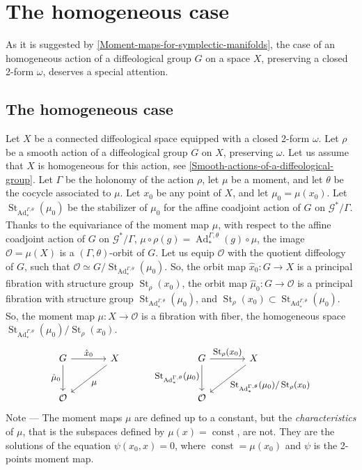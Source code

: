 \documentclass[10pt,reqno,twoside]{amsart}
\newcommand{\cG}{\mathcal{G}}
\newcommand{\cO}{\mathcal{O}}
\DeclareMathOperator{\Stab}{St}
\DeclareMathOperator{\Ad}{Ad}
\DeclareMathOperator{\const}{const}
\theoremstyle{plain}
\theoremstyle{definition}
\newcommand{\article}[1]{\subsection{#1}}
\begin{document}
  \section{The homogeneous case}
  
  As it is suggested by \ref{Moment-maps-for-symplectic-manifolds},
  the case of an homogeneous action of a diffeological group $G$ on a space $X$,
  preserving a closed 2-form $\omega$,
  deserves a special attention.
  
  \article{The homogeneous case}
  \label{The-homogeneous-case}
  Let $X$ be a connected diffeological space equipped with a closed 2-form $\omega$.
  Let $\rho$ be a smooth action of a diffeological group $G$ on $X$,
  preserving $\omega$.
  Let us assume that $X$ is homogeneous for this action,
  see \ref{Smooth-actions-of-a-diffeological-group}.
  Let $\Gamma$ be the holonomy of the action $\rho$,
  let $\mu$ be a moment,
  and let $\theta$ be the cocycle associated to $\mu$.
  Let $x_0$ be any point of $X$,
  and let $\mu_0 = \mu(x_0)$.
  Let $\Stab_{\Ad_*^{\Gamma,\theta}}(\mu_0)$ be the stabilizer of $\mu_0$ for the affine coadjoint action of $G$ on $\cG^*\!/\Gamma$.
  Thanks to the equivariance of the moment map $\mu$,
  with respect to the affine coadjoint action of $G$ on $\cG^*\!/\Gamma$,
  $\mu \circ \rho(g) = \Ad_*^{\Gamma,\theta}(g) \circ \mu$,
  the image $\cO = \mu(X)$ is a $(\Gamma,\theta)$-orbit of $G$.
  Let us equip $\cO$ with the quotient diffeology of $G$,
  such that $\cO \simeq G/\Stab_{\Ad_*^{\Gamma,\theta}}(\mu_0)$.
  So,
  the orbit map $\hat x_0 : G \to X$ is a principal fibration with structure group $\Stab_\rho(x_0)$,
  the orbit map $\hat \mu_0 : G \to \cO$ is a principal fibration with structure group $\Stab_{\Ad_*^{\Gamma,\theta}}(\mu_0)$,
  and $\Stab_\rho(x_0) \subset \Stab_{\Ad_*^{\Gamma,\theta}}(\mu_0)$.
  So,
  the moment map $\mu : X \to \cO$ is a fibration with fiber,
  the homogeneous space $\Stab_{\Ad_*^{\Gamma,\theta}}(\mu_0)/\Stab_\rho(x_0)$.
  \[
  \begin{tikzcd}[column sep=large, row sep=large, every label/.append style = {font = \small}]
    G \arrow[r, "\hat x_0"] \arrow[d, "\hat \mu_0"'] & X \arrow[dl, "\mu"] \\
    \cO
  \end{tikzcd}
  \quad \quad \quad
  \begin{tikzcd}[column sep=large, row sep=large, every label/.append style = {font = \small}]
    G \arrow[r, "\Stab_\rho(x_0)"] \arrow[d, "\Stab_{\Ad_*^{\Gamma,\theta}}(\mu_0)"'] & X \arrow[dl, "\Stab_{\Ad_*^{\Gamma,\theta}}(\mu_0)/\Stab_\rho(x_0)"] \\
    \cO
  \end{tikzcd}
  \]
  {\sc Note} --- The moment maps $\mu$ are defined up to a constant,
  but the {\em characteristics} of $\mu$,
  that is the subspaces defined by $\mu(x) = \const$,
  are not.
  They are the solutions of the equation $\psi(x_0,x) = 0$,
  where $\const = \mu(x_0)$ and $\psi$ is the 2-points moment map.
  
\end{document}
